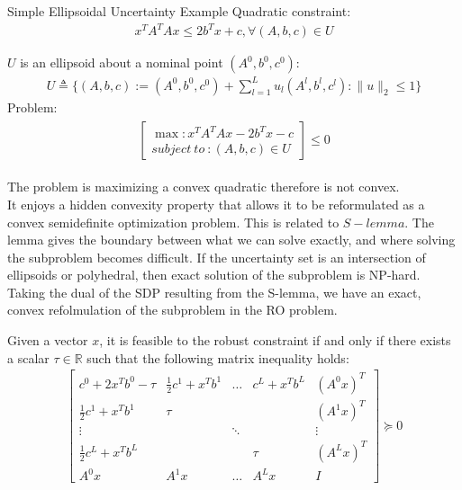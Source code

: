 \documentclass{beamer}
\begin{document}
\begin{frame}{Simple Ellipsoidal Uncertainty Example}
Quadratic constraint: \\
\begin{align}
x^{T}A^{T}Ax \leq 2b^Tx + c, \forall (A,b,c) \in U
\end{align}

$U$ is an ellipsoid about a nominal point $(A^{0}, b^{0}, c^{0})$:
\begin{align}
U \triangleq \{ (A,b,c) := (A^{0},b^{0},c^{0}) + \sum^{L}_{l=1}u_{l}(A^{l},b^{l},c^{l}) : \lVert u \rVert_{2} \leq 1 \}
\end{align}
Problem:
\begin{align*}
\begin{split}
\left[
    \begin{array}{l}
        \max : x^{T}A^{T}Ax - 2b^{T}x - c \\
        subject~to~: (A,b,c) \in U
    \end{array}
\right] \leq 0
\end{split}
\end{align*}
\end{frame}

\begin{frame}{}
The problem is maximizing a convex quadratic therefore is not convex. \\
It enjoys a hidden convexity property that allows it to be reformulated as a convex semidefinite optimization problem. This is related to $S-lemma$.
The lemma gives the boundary between what we can solve exactly, and where solving the subproblem becomes difficult.
If the uncertainty set is an intersection of ellipsoids or polyhedral, then exact solution of the subproblem is NP-hard.
Taking the dual of the SDP resulting from the S-lemma, we have an exact, convex refolmulation of the subproblem in the RO problem.
\end{frame}

\begin{frame}{}
\begin{block}{}
Given a vector $x$, it is feasible to the robust constraint if and only if there exists a scalar $\tau \in \mathbb{R}$ such that the following matrix inequality holds:
\begin{align*}
    \begin{bmatrix}
    c^0 + 2x^Tb^0 - \tau & \frac{1}{2}c^1+x^Tb^1 & \dots & c^L+x^Tb^L & \left(A^{0}x\right)^{T} \\
    \frac{1}{2}c^{1} + x^Tb^{1} & \tau & & & \left(A^{1}x\right)^{T} \\
    \vdots & & \ddots & & \vdots \\
    \frac{1}{2}c^{L} + x^{T}b^{L} & & & \tau & \left(A^{L}x\right)^{T} \\
    A^{0}x & A^{1}x & \dots & A^{L}x & I
    \end{bmatrix} \succeq 0
\end{align*}
\end{block}
\end{frame}
\end{document}
